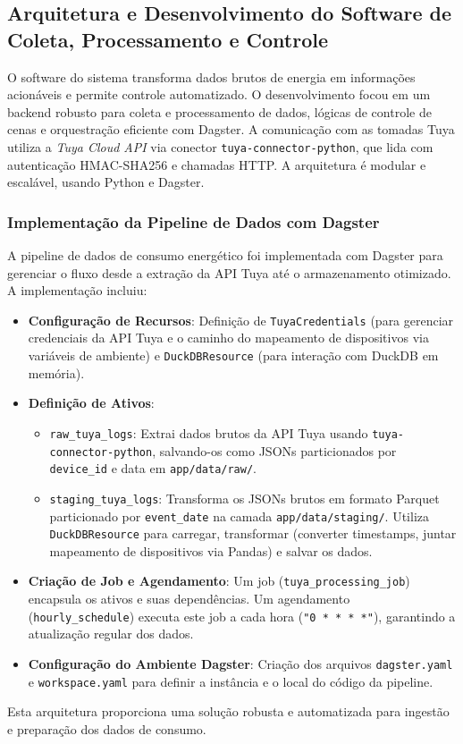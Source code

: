 \subsection{Arquitetura e Desenvolvimento do Software de Coleta, Processamento e Controle}
\label{subsec:arquitetura_software}
O software do sistema transforma dados brutos de energia em informações acionáveis e permite controle automatizado. O desenvolvimento focou em um backend robusto para coleta e processamento de dados, lógicas de controle de cenas e orquestração eficiente com Dagster. A comunicação com as tomadas Tuya utiliza a \textit{Tuya Cloud API} via conector \texttt{tuya-connector-python}, que lida com autenticação HMAC-SHA256 e chamadas HTTP. A arquitetura é modular e escalável, usando Python e Dagster.

\subsubsection{Implementação da Pipeline de Dados com Dagster}
\label{subsubsec:pipeline_dagster}
A pipeline de dados de consumo energético foi implementada com Dagster para gerenciar o fluxo desde a extração da API Tuya até o armazenamento otimizado. A implementação incluiu:
\begin{itemize}
    \item \textbf{Configuração de Recursos}: Definição de \texttt{TuyaCredentials} (para gerenciar credenciais da API Tuya e o caminho do mapeamento de dispositivos via variáveis de ambiente) e \texttt{DuckDBResource} (para interação com DuckDB em memória).
    \item \textbf{Definição de Ativos}:
    \begin{itemize}
        \item \texttt{raw\_tuya\_logs}: Extrai dados brutos da API Tuya usando \texttt{tuya-connector-python}, salvando-os como JSONs particionados por \texttt{device\_id} e data em \texttt{app/data/raw/}.
        \item \texttt{staging\_tuya\_logs}: Transforma os JSONs brutos em formato Parquet particionado por \texttt{event\_date} na camada \texttt{app/data/staging/}. Utiliza \texttt{DuckDBResource} para carregar, transformar (converter timestamps, juntar mapeamento de dispositivos via Pandas) e salvar os dados.
    \end{itemize}
    \item \textbf{Criação de Job e Agendamento}: Um job (\texttt{tuya\_processing\_job}) encapsula os ativos e suas dependências. Um agendamento (\texttt{hourly\_schedule}) executa este job a cada hora (\texttt{"0 * * * *"}), garantindo a atualização regular dos dados.
    \item \textbf{Configuração do Ambiente Dagster}: Criação dos arquivos \texttt{dagster.yaml} e \texttt{workspace.yaml} para definir a instância e o local do código da pipeline.
\end{itemize}
Esta arquitetura proporciona uma solução robusta e automatizada para ingestão e preparação dos dados de consumo.

